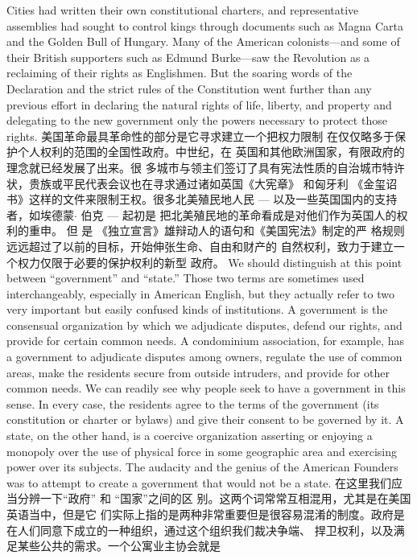 \begin{paracol}{2}
Cities had written their own constitutional charters, and representative assemblies had sought to control kings through documents such as Magna Carta and the Golden Bull of Hungary.
Many of the American colonists---and some of their British
supporters such as Edmund Burke---saw the Revolution as a reclaiming of their rights as Englishmen. But the soaring words
of the Declaration and the strict rules of the Constitution went
further than any previous effort in declaring the natural rights
of life, liberty, and property and delegating to the new government only the powers necessary to protect those rights.
\switchcolumn
美国革命最具革命性的部分是它寻求建立一个把权力限制
在仅仅略多于保护个人权利的范围的全国性政府。中世纪，在
英国和其他欧洲国家，有限政府的理念就已经发展了出来。很
多城市与领主们签订了具有宪法性质的自治城市特许状，贵族或平民代表会议也在寻求通过诸如英国《大宪章》 和匈牙利
《金玺诏书》这样的文件来限制王权。很多北美殖民地人民
--- 以及一些英国国内的支持者，如埃德蒙$\cdot$ 伯克 --- 起初是
把北美殖民地的革命看成是对他们作为英国人的权利的重申。
但 是 《独立宣言》雄辩动人的语句和《美国宪法》制定的严
格规则远远超过了以前的目标，开始伸张生命、自由和财产的
自然权利，致力于建立一个权力仅限于必要的保护权利的新型
政府。
\switchcolumn*
We should distinguish at this point between ``government''
and ``state.'' Those two terms are sometimes used interchangeably, especially in American English, but they actually refer to
two very important but easily confused kinds of institutions. A
government is the consensual organization by which we adjudicate disputes, defend our rights, and provide for certain common needs. A condominium association, for example, has a
government to adjudicate disputes among owners, regulate the
use of common areas, make the residents secure from outside
intruders, and provide for other common needs. We can readily
see why people seek to have a government in this sense. In
every case, the residents agree to the terms of the government
(its constitution or charter or bylaws) and give their consent to
be governed by it. A state, on the other hand, is a coercive organization asserting or enjoying a monopoly over the use of
physical force in some geographic area and exercising power
over its subjects. The audacity and the genius of the American
Founders was to attempt to create a government that would
not be a state.
\switchcolumn
在这里我们应当分辨一下“政府” 和 “国家”之间的区
别。这两个词常常互相混用，尤其是在美国英语当中，但是它
们实际上指的是两种非常重要但是很容易混淆的制度。政府是
在人们同意下成立的一种组织，通过这个组织我们裁决争端、
捍卫权利，以及满足某些公共的需求。一个公寓业主协会就是

\end{paracol}
